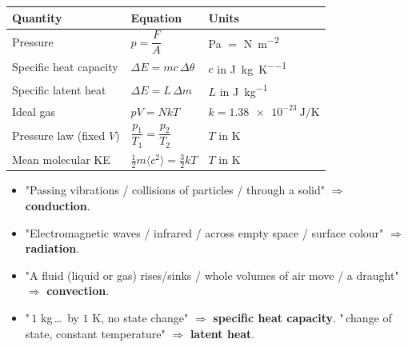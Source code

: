\documentclass[11pt,a4paper]{article}
\newcommand{\dtheta}{\Delta\theta}
\newcommand{\dE}{\Delta E}
\begin{document}
\begin{keybox}
\begin{center}
\renewcommand{\arraystretch}{1.5}
\begin{tabular}{@{}p{4.7cm}p{5.3cm}p{4.6cm}@{}}
\toprule
\textbf{Quantity} & \textbf{Equation} & \textbf{Units} \\
\midrule
Pressure & $p = \dfrac{F}{A}$ & \si{\pascal} $=$ \si{\newton\per\metre\squared} \\
Specific heat capacity & $\dE = mc\,\dtheta$ & $c$ in \si{\joule\per\kilogram\per\kelvin} \\
Specific latent heat & $\dE = L\,\Delta m$ & $L$ in \si{\joule\per\kilogram} \\
Ideal gas & $pV = NkT$ & $k = \SI{1.38e-23}{\joule\per\kelvin}$ \\
Pressure law (fixed $V$) & $\dfrac{p_1}{T_1} = \dfrac{p_2}{T_2}$ & $T$ in \si{\kelvin} \\
Mean molecular KE & $\tfrac{1}{2}m\langle c^2\rangle = \tfrac{3}{2}kT$ & $T$ in \si{\kelvin} \\
\bottomrule
\end{tabular}
\end{center}
\end{keybox}

\begin{keybox}
\begin{itemize}[leftmargin=1.4em,itemsep=1pt]
  \item "Passing vibrations / collisions of particles / through a solid" $\Rightarrow$
        \textbf{conduction}.
  \item "Electromagnetic waves / infrared / across empty space / surface colour"
        $\Rightarrow$ \textbf{radiation}.
  \item "A fluid (liquid or gas) rises/sinks / whole volumes of air move / a draught"
        $\Rightarrow$ \textbf{convection}.
  \item "\,$1$ kg\,\ldots\ by $1$ K, no state change" $\Rightarrow$ \textbf{specific
        heat capacity}. "\,change of state, constant temperature" $\Rightarrow$
        \textbf{latent heat}.
\end{itemize}
\end{keybox}
\end{document}
